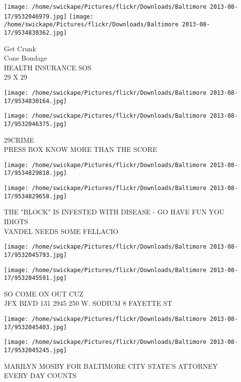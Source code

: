 \documentclass[10pt,letterpaper]{article}
\begin{document}
\texttt{[image: /home/swickape/Pictures/flickr/Downloads/Baltimore 2013-08-17/9532046979.jpg]}
\texttt{[image: /home/swickape/Pictures/flickr/Downloads/Baltimore 2013-08-17/9534830362.jpg]}

Get Crunk\\
Cone Bondage\\
HEALTH INSURANCE SOS\\
29 X 29\\
\pagebreak

\texttt{[image: /home/swickape/Pictures/flickr/Downloads/Baltimore 2013-08-17/9534830164.jpg]}

\vspace{0.25in}
\texttt{[image: /home/swickape/Pictures/flickr/Downloads/Baltimore 2013-08-17/9532046375.jpg]}

29CRIME\\
PRESS BOX KNOW MORE THAN THE SCORE\\
\pagebreak

\texttt{[image: /home/swickape/Pictures/flickr/Downloads/Baltimore 2013-08-17/9534829818.jpg]}

\vspace{0.25in}
\texttt{[image: /home/swickape/Pictures/flickr/Downloads/Baltimore 2013-08-17/9534829658.jpg]}

THE "BLOCK" IS INFESTED WITH DISEASE {-} GO HAVE FUN YOU IDIOTS\\
VANDEL NEEDS SOME FELLACIO\\
\pagebreak

\texttt{[image: /home/swickape/Pictures/flickr/Downloads/Baltimore 2013-08-17/9532045793.jpg]}

\vspace{0.25in}
\texttt{[image: /home/swickape/Pictures/flickr/Downloads/Baltimore 2013-08-17/9532045591.jpg]}

SO COME ON OUT CUZ\\
JFX BLVD 131 2945 250 W. SODIUM 8 FAYETTE ST\\
\pagebreak

\texttt{[image: /home/swickape/Pictures/flickr/Downloads/Baltimore 2013-08-17/9532045403.jpg]}

\vspace{0.25in}
\texttt{[image: /home/swickape/Pictures/flickr/Downloads/Baltimore 2013-08-17/9532045245.jpg]}

MARILYN MOSBY FOR BALTIMORE CITY STATE'S ATTORNEY\\
EVERY DAY COUNTS\\
\pagebreak
\end{document}
